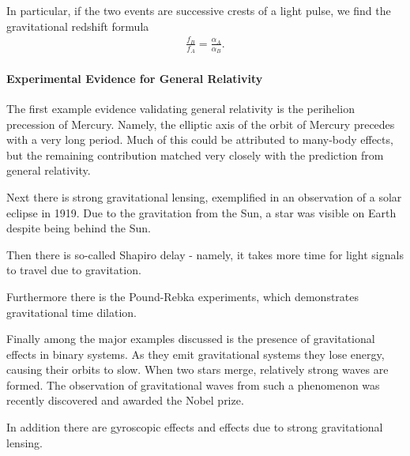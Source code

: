 In particular, if the two events are successive crests of a light pulse, we find the gravitational redshift formula
\begin{align*}
	\frac{f_{B}}{f_{A}} = \frac{\alpha_{A}}{\alpha_{B}}.
\end{align*}

\paragraph{Experimental Evidence for General Relativity}
The first example evidence validating general relativity is the perihelion precession of Mercury. Namely, the elliptic axis of the orbit of Mercury precedes with a very long period. Much of this could be attributed to many-body effects, but the remaining contribution matched very closely with the prediction from general relativity.

Next there is strong gravitational lensing, exemplified in an observation of a solar eclipse in 1919. Due to the gravitation from the Sun, a star was visible on Earth despite being behind the Sun.

Then there is so-called Shapiro delay - namely, it takes more time for light signals to travel due to gravitation.

Furthermore there is the Pound-Rebka experiments, which demonstrates gravitational time dilation.

Finally among the major examples discussed is the presence of gravitational effects in binary systems. As they emit gravitational systems they lose energy, causing their orbits to slow. When two stars merge, relatively strong waves are formed. The observation of gravitational waves from such a phenomenon was recently discovered and awarded the Nobel prize.

In addition there are gyroscopic effects and effects due to strong gravitational lensing.
